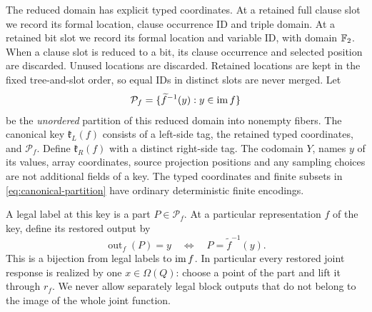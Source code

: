 The reduced domain has explicit typed coordinates.  At a retained full
clause slot we record its formal location, clause occurrence ID and
triple domain.  At a retained bit slot we record its formal location
and variable ID, with domain $\mathbb F_2$.  When a clause slot is reduced to a
bit, its clause occurrence and selected position are discarded.
Unused locations are discarded.  Retained locations are kept in the fixed
tree-and-slot order, so equal IDs in distinct slots are never merged.
Let
\begin{equation}\label{eq:canonical-partition}
 \mathcal P_f=
 \{\widetilde f^{-1}(y):y\in\operatorname{im} f\}
\end{equation}
be the \emph{unordered} partition of this reduced domain into nonempty
fibers.  The canonical key $\mathfrak k_L(f)$ consists of a left-side
tag, the retained typed coordinates, and $\mathcal P_f$.
Define $\mathfrak k_R(f)$ with a distinct right-side tag.
The codomain $Y$, names $y$ of its values, array coordinates, source
projection positions and any sampling choices are not additional fields
of a key.  The typed coordinates and finite subsets in
\eqref{eq:canonical-partition} have ordinary deterministic finite encodings.

A legal label at this key is a part $P\in\mathcal P_f$.
At a particular representation $f$ of the key, define its restored output
by
\begin{equation}\label{eq:restored-output}
 \operatorname{out}_f(P)=y
 \quad\Longleftrightarrow\quad
 P=\widetilde f^{-1}(y).
\end{equation}
This is a bijection from legal labels to $\operatorname{im} f$.
In particular every restored joint response is realized by one
$x\in\Omega(Q)$: choose a point of the part and lift it through $r_f$.
We never allow separately legal block outputs that do not belong to
the image of the whole joint function.


